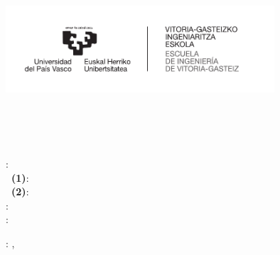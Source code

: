 \thispagestyle{empty}

\vspace*{-2.1in}
\begin{flushleft}\hspace{-0.2\textwidth}
\includegraphics[width=0.75\textwidth]{config/EIVG-logo.pdf} 
\end{flushleft}


\newcommand{\HRule}{\rule{\linewidth}{0.5mm}} 

\thispagestyle{empty}
\begin{center}
  \vspace*{2cm}

  {\huge \MakeUppercase{\titulacion}}\\[0.8cm]
  \ifdefined\especialidad
  {\especialidad}\\[0.8cm]
  \fi
  {\HUGE \textbf{\MakeUppercase{{\tfglabel}}}}\\[1.3cm]
  
  
  
  
  \begin{framed}    \vspace*{1cm}
  \HUGE 
    \textbf{\MakeUppercase{\titulo}} 
  \vspace*{1cm}
  \end{framed}


\end{center}
  
   
  \vfill
  \begin{flushleft}  
  \textbf{\studentlabel}: \alumno \\[0.4cm]
  \ifdefined\directordos 
    \textbf{\directorlabel~(1)}: \directoruno \\[0.4cm]
    \textbf{\directorlabel~(2)}: \directordos \\[0.8cm]
  \else 
      \textbf{\directorlabel}: \directoruno \\[0.8cm]
  \fi
  \textbf{\courselabel}: \curso \\[1cm]
  \end{flushleft}
  \begin{flushright}
  \textbf{\datelabel}: \ciudad, \fecha
    \end{flushright}
